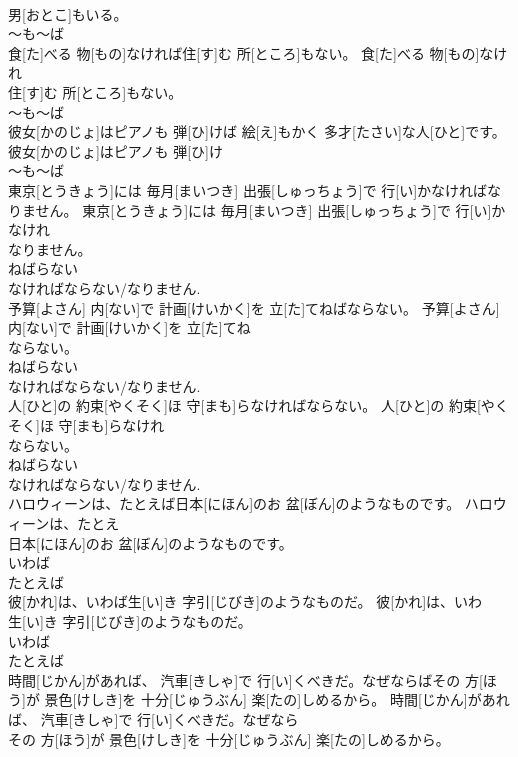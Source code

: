 \documentclass[8pt]{extreport}
\begin{document}
\begin{CJK}{UTF8}{min}
\\	男[おとこ]もいる。	
\\	～も～ば 
\\	食[た]べる 物[もの]なければ住[す]む 所[ところ]もない。	食[た]べる 物[もの]なけれ
\\	住[す]む 所[ところ]もない。	
\\	～も～ば 
\\	彼女[かのじょ]はピアノも 弾[ひ]けば 絵[え]もかく 多才[たさい]な人[ひと]です。	彼女[かのじょ]はピアノも 弾[ひ]け
\\	～も～ば 
\\	東京[とうきょう]には 毎月[まいつき] 出張[しゅっちょう]で 行[い]かなければなりません。	東京[とうきょう]には 毎月[まいつき] 出張[しゅっちょう]で 行[い]かなけれ
\\	なりません。	
\\	ねばらない 
\\	なければならない/なりません.
\\	予算[よさん] 内[ない]で 計画[けいかく]を 立[た]てねばならない。	予算[よさん] 内[ない]で 計画[けいかく]を 立[た]てね
\\	ならない。	
\\	ねばらない 
\\	なければならない/なりません.
\\	人[ひと]の 約束[やくそく]ほ 守[まも]らなければならない。	人[ひと]の 約束[やくそく]ほ 守[まも]らなけれ
\\	ならない。	
\\	ねばらない 
\\	なければならない/なりません.
\\	ハロウィーンは、たとえば日本[にほん]のお 盆[ぼん]のようなものです。	ハロウィーンは、たとえ
\\	日本[にほん]のお 盆[ぼん]のようなものです。	
\\	いわば 
\\	たとえば
\\	彼[かれ]は、いわば生[い]き 字引[じびき]のようなものだ。	彼[かれ]は、いわ
\\	生[い]き 字引[じびき]のようなものだ。	
\\	いわば 
\\	たとえば
\\	時間[じかん]があれば、 汽車[きしゃ]で 行[い]くべきだ。なぜならばその 方[ほう]が 景色[けしき]を 十分[じゅうぶん] 楽[たの]しめるから。	時間[じかん]があれば、 汽車[きしゃ]で 行[い]くべきだ。なぜなら
\\	その 方[ほう]が 景色[けしき]を 十分[じゅうぶん] 楽[たの]しめるから。	

\end{CJK}
\end{document}
